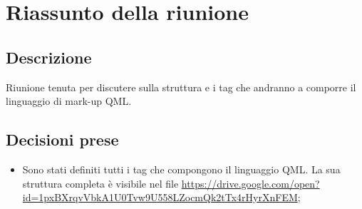 \section{Riassunto della riunione}
\subsection{Descrizione}

Riunione tenuta per discutere sulla struttura e i tag che andranno a comporre il linguaggio di mark-up QML.

\subsection{Decisioni prese}
\begin{itemize}
\item Sono stati definiti tutti i tag che compongono il linguaggio QML. La sua struttura completa è visibile nel file \url{https://drive.google.com/open?id=1pxBXrqvVbkA1U0Tvw9U558LZocmQk2tTx4rHyrXnFEM};
\end{itemize}
